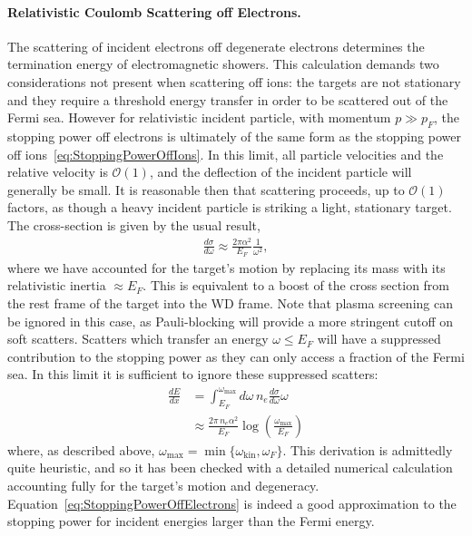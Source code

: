 \documentclass[preprintnumbers,amsmath,amssymb,prd,superscriptaddress]{revtex4}
\newcommand{\OO}{\mathcal{O}}
\newcommand{\kin}{\text{kin}}
\newcommand{\xmax}{\text{max}}
\begin{document}
\begin{appendices}
\paragraph{Relativistic Coulomb Scattering off Electrons.}
\label{sec:coulomb_elec}
The scattering of incident electrons off degenerate electrons determines the termination energy of electromagnetic showers.
This calculation demands two considerations not present when scattering off ions: the targets are not stationary and they require a threshold energy transfer in order to be scattered out of the Fermi sea.
However for relativistic incident particle, with momentum $p \gg p_F$, the stopping power off electrons is ultimately of the same form as the stopping power off ions~\eqref{eq:StoppingPowerOffIons}.
In this limit, all particle velocities and the relative velocity is $\OO(1)$, and the deflection of the incident particle will generally be small.
It is reasonable then that scattering proceeds, up to $\OO(1)$ factors, as though a heavy incident particle is striking a light, stationary target.
The cross-section is given by the usual result,
\begin{align}
  \frac{d \sigma}{d \omega} \approx
  \frac{2 \pi \alpha^2}{E_F} \frac{1}{\omega^2},
  \label{eq:CoulombRelativisticApprox}
\end{align}
where we have accounted for the target's motion by replacing its mass with its relativistic inertia $\approx E_F$.
This is equivalent to a boost of the cross section from the rest frame of the target into the WD frame.
Note that plasma screening can be ignored in this case, as Pauli-blocking will provide a more stringent cutoff on soft scatters.
Scatters which transfer an energy $\omega \leq E_F$ will have a suppressed contribution to the stopping power as they can only access a fraction of the Fermi sea.
In this limit it is sufficient to ignore these suppressed scatters:
\begin{align}
  \frac{dE}{d x} &= \int_{E_F}^{\omega_\xmax} d \omega \, n_e
  \frac{d \sigma}{d \omega} \omega \nonumber\\
  \label{eq:StoppingPowerOffElectrons}
   &\approx \frac{2 \pi\, n_e \alpha^2 }{E_F}
   \log\left( \frac{\omega_\xmax}{E_F} \right)
\end{align}
where, as described above, $\omega_\xmax = \min\{\omega_\kin, \omega_F\}$.
This derivation is admittedly quite heuristic, and so it has been checked with a detailed numerical calculation accounting fully for the target's motion and degeneracy.
Equation~\eqref{eq:StoppingPowerOffElectrons} is indeed a good approximation to the stopping power for incident energies larger than the Fermi energy.


\end{appendices}
\end{document}
